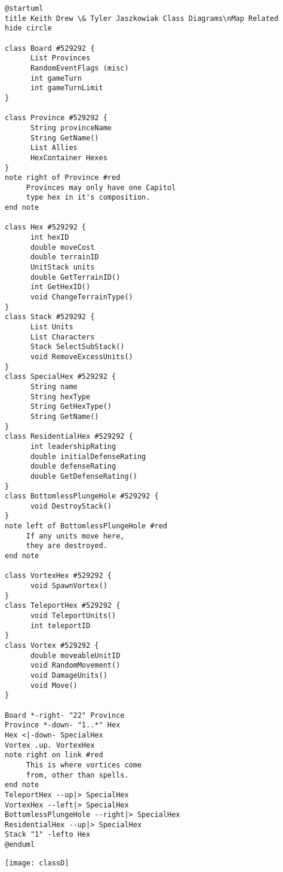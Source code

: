 \documentclass[12pt,a4paper]{article}
\begin{document}
\begin{verbatim}
@startuml
title Keith Drew \& Tyler Jaszkowiak Class Diagrams\nMap Related
hide circle

class Board #529292 {
      List Provinces
      RandomEventFlags (misc)
      int gameTurn
      int gameTurnLimit
}

class Province #529292 {
      String provinceName
      String GetName()
      List Allies
      HexContainer Hexes
}
note right of Province #red
     Provinces may only have one Capitol
     type hex in it's composition.
end note 

class Hex #529292 {
      int hexID
      double moveCost
      double terrainID
      UnitStack units
      double GetTerrainID()
      int GetHexID()
      void ChangeTerrainType()
}
class Stack #529292 {
      List Units
      List Characters
      Stack SelectSubStack()
      void RemoveExcessUnits()
}
class SpecialHex #529292 {
      String name
      String hexType
      String GetHexType()
      String GetName()
}
class ResidentialHex #529292 {
      int leadershipRating
      double initialDefenseRating
      double defenseRating
      double GetDefenseRating()
}
class BottomlessPlungeHole #529292 {
      void DestroyStack()
}
note left of BottomlessPlungeHole #red
     If any units move here, 
     they are destroyed.
end note 

class VortexHex #529292 {
      void SpawnVortex()
}
class TeleportHex #529292 {
      void TeleportUnits()
      int teleportID
}
class Vortex #529292 {
      double moveableUnitID
      void RandomMovement()
      void DamageUnits()
      void Move()
}

Board *-right- "22" Province 
Province *-down- "1..*" Hex
Hex <|-down- SpecialHex
Vortex .up. VortexHex
note right on link #red
     This is where vortices come
     from, other than spells.
end note  
TeleportHex --up|> SpecialHex
VortexHex --left|> SpecialHex
BottomlessPlungeHole --right|> SpecialHex
ResidentialHex --up|> SpecialHex
Stack "1" -lefto Hex
@enduml
\end{verbatim}

\pagebreak
\texttt{[image: classD]}
\end{document}

